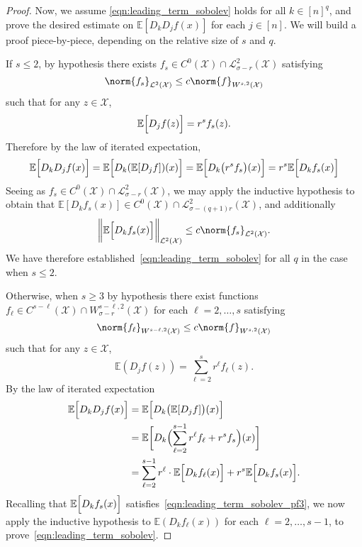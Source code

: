 \documentclass{article}
\newcommand{\1}{\mathbf{1}}
\newcommand{\Xset}{\mathcal{X}}
\newcommand{\Leb}{\mathcal{L}}
\newcommand{\Ebb}{\mathbb{E}}
\theoremstyle{alden}
\theoremstyle{aldenthm}
\theoremstyle{definition}
\theoremstyle{remark}
\begin{document}
\begin{proof}
	
	Now, we assume \eqref{eqn:leading_term_sobolev} holds for all $k \in [n]^q$, and prove the desired estimate on $\Ebb[D_{k}D_jf(x)]$ for each $j \in [n]$. We will build a proof piece-by-piece, depending on the relative size of $s$ and $q$.
	
	If $s \leq 2$, by hypothesis there exists $f_s \in C^{0}(\Xset) \cap \Leb_{\sigma - r}^{2}(\Xset)$ satisfying
	\begin{equation*}
	\norm{f_s}_{\Leb^2(\Xset)} \leq c \norm{f}_{W^{s,2}(\Xset)}
	\end{equation*}
	such that for any $z \in \Xset$,
	\begin{equation*}
	\Ebb\Bigl[D_jf(z)\Bigr] = r^s f_s(z).
	\end{equation*}
	Therefore by the law of iterated expectation,
	\begin{equation*}
	\Ebb\Bigl[D_kD_jf(x)\Bigr] = \Ebb\Bigl[D_k(\Ebb[D_jf])(x)\Bigr] = \Ebb\Bigl[D_k\bigl(r^s f_s\bigr)(x)\Bigr] = r^s \Ebb\Bigl[D_kf_s(x)\Bigr]
	\end{equation*}
	Seeing as $f_s \in C^{0}(\Xset) \cap \Leb_{\sigma - r}^2(\Xset)$, we may apply the inductive hypothesis to obtain that $\Ebb[D_kf_s(x)] \in C^0(\Xset) \cap \Leb_{\sigma - (q + 1)r}^2(\Xset)$, and additionally
	\begin{equation}
	\label{eqn:leading_term_sobolev_pf3}
	\biggl\|\Ebb\Bigl[D_kf_s(x)\Bigr]\biggr\|_{\Leb^2(\Xset)} \leq c \norm{f_s}_{\Leb^2(\Xset)}.
	\end{equation}
	We have therefore established~\eqref{eqn:leading_term_sobolev} for all $q$ in the case when $s \leq 2$. 
	
	Otherwise, when $s \geq 3$ by hypothesis there exist functions $f_{\ell} \in C^{s - \ell}(\Xset) \cap W_{\sigma - r}^{s - \ell,2}(\Xset)$ for each $\ell = 2,\ldots,s$ satisfying
	\begin{equation*}
	\norm{f_{\ell}}_{W^{s - \ell,2}(\Xset)} \leq c \norm{f}_{W^{s,2}(\Xset)}
	\end{equation*}
	such that for any $z \in \Xset$,
	\begin{equation*}
	\Ebb(D_jf(z)) = \sum_{\ell = 2}^{s} r^{\ell} f_{\ell}(z).
	\end{equation*}
	By the law of iterated expectation
	\begin{align*}
	\Ebb\Bigl[D_{k}D_jf(x)\Bigr] & = \Ebb\Bigl[D_k\bigl(\Ebb[D_jf]\bigr)(x)\Bigr] \\
	& = \Ebb\biggl[D_k\Bigl(\sum_{\ell = 2}^{s - 1} r^{\ell} f_{\ell} + r^s f_s\Bigr)(x)\biggr] \\
	& = \sum_{\ell = 2}^{s - 1} r^{\ell} \cdot \Ebb\Bigl[D_kf_{\ell}(x)\Bigr] + r^s \Ebb\Bigl[D_kf_s(x)\Bigr].
	\end{align*}
	Recalling that $\Ebb\Bigl[D_kf_s(x)\Bigr]$ satisfies~\eqref{eqn:leading_term_sobolev_pf3}, we now apply the inductive hypothesis to $\Ebb(D_kf_{\ell}(x))$ for each $\ell = 2,\ldots,s-1$, to prove~\eqref{eqn:leading_term_sobolev}.
	

\end{proof}
\end{document}
